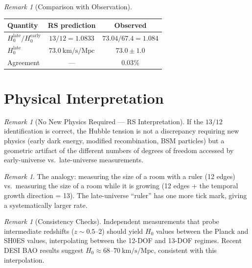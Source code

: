 \documentclass[12pt,a4paper]{article}
\theoremstyle{definition}
\theoremstyle{remark}
\newtheorem{remark}[theorem]{Remark}
\begin{document}
\begin{remark}[Comparison with Observation]
\begin{center}
\renewcommand{\arraystretch}{1.3}
\begin{tabular}{@{}lcc@{}}
\toprule
\textbf{Quantity} & \textbf{RS prediction} &
\textbf{Observed} \\
\midrule
$H_0^{\mathrm{late}} / H_0^{\mathrm{early}}$ &
$13/12 = 1.0833$ & $73.04/67.4 = 1.084$ \\
$H_0^{\mathrm{late}}$ &
$73.0~\mathrm{km/s/Mpc}$ &
$73.0 \pm 1.0$ \\
Agreement & --- & $0.03\%$ \\
\bottomrule
\end{tabular}
\end{center}
\end{remark}

\section{Physical Interpretation}
\label{sec:interpretation}

\begin{remark}[No New Physics Required --- RS Interpretation]
\label{prop:no-new}
If the $13/12$ identification is correct, the Hubble tension is not a
discrepancy requiring new physics (early dark energy, modified
recombination, BSM particles) but a geometric artifact of the
different numbers of degrees of freedom accessed by
early-universe vs.\ late-universe measurements.
\end{remark}

\begin{remark}
The analogy: measuring the size of a room with a ruler
(12 edges) vs.\ measuring the size of a room while it is
growing (12 edges + the temporal growth direction = 13).
The late-universe ``ruler'' has one more tick mark, giving
a systematically larger rate.
\end{remark}

\begin{remark}[Consistency Checks]
Independent measurements that probe intermediate
redshifts ($z \sim 0.5$--$2$) should yield $H_0$ values
between the Planck and SH0ES values, interpolating between
the 12-DOF and 13-DOF regimes.  Recent DESI BAO results
suggest $H_0 \approx 68$--$70~\mathrm{km/s/Mpc}$,
consistent with this interpolation.
\end{remark}
\end{document}
